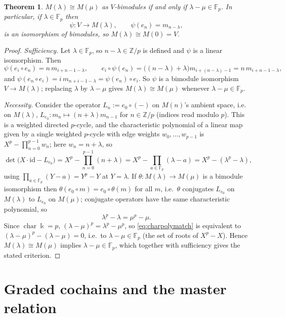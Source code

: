 \documentclass[11pt,reqno]{amsart}
\theoremstyle{plain}
\newtheorem{theorem}{Theorem}[section]
\theoremstyle{definition}
\newcommand{\kk}{\Bbbk}
\newcommand{\Fp}{\mathbb{F}_p}
\newcommand{\Zp}{\mathbb{Z}/p}
\begin{document}
\begin{theorem}\label{thm:iso}
$M(\lambda)\cong M(\mu)$ as $V$-bimodules if and only if $\lambda-\mu\in\Fp$. In particular,
if $\lambda\in\Fp$ then
\[
\psi:V\longrightarrow M(\lambda),\qquad \psi(e_n)=m_{n-\lambda},
\]
is an isomorphism of bimodules, so $M(\lambda)\cong M(0)=V$.
\end{theorem}

\begin{proof}
\emph{Sufficiency.} Let $\lambda\in\Fp$, so $n-\lambda\in\Zp$ is defined and $\psi$ is a
linear isomorphism. Then
\[
\psi(e_i\circ e_n)=n\,m_{i+n-1-\lambda},\qquad
e_i\circ\psi(e_n)=\bigl((n-\lambda)+\lambda\bigr)m_{i+(n-\lambda)-1}=n\,m_{i+n-1-\lambda},
\]
and $\psi(e_n\circ e_i)=i\,m_{n+i-1-\lambda}=\psi(e_n)\circ e_i$. So $\psi$ is a bimodule
isomorphism $V\to M(\lambda)$; replacing $\lambda$ by $\lambda-\mu$ gives
$M(\lambda)\cong M(\mu)$ whenever $\lambda-\mu\in\Fp$.

\emph{Necessity.} Consider the operator $L_n:=e_0\circ(-)$ on $M(n)$'s ambient space, i.e.
on $M(\lambda)$, $L_{e_0}:m_n\mapsto(n+\lambda)m_{n-1}$ for $n\in\Zp$ (indices read modulo
$p$). This is a weighted directed $p$-cycle, and the characteristic polynomial of a linear
map given by a single weighted $p$-cycle with edge weights $w_0,\dots,w_{p-1}$ is
$X^p-\prod_{n=0}^{p-1}w_n$; here $w_n=n+\lambda$, so
\[
\det\bigl(X\cdot\mathrm{id}-L_{e_0}\bigr)=X^p-\prod_{n=0}^{p-1}(n+\lambda)
=X^p-\prod_{a\in\Fp}(\lambda-a)=X^p-(\lambda^p-\lambda),
\]
using $\prod_{a\in\Fp}(Y-a)=Y^p-Y$ at $Y=\lambda$. If $\theta:M(\lambda)\to M(\mu)$ is a
bimodule isomorphism then $\theta(e_0\circ m)=e_0\circ\theta(m)$ for all $m$, i.e.\ $\theta$
conjugates $L_{e_0}$ on $M(\lambda)$ to $L_{e_0}$ on $M(\mu)$; conjugate operators have the
same characteristic polynomial, so
\begin{equation}
\lambda^p-\lambda=\mu^p-\mu .
\label{eq:charpolymatch}
\end{equation}
Since $\operatorname{char}\kk=p$, $(\lambda-\mu)^p=\lambda^p-\mu^p$, so
\eqref{eq:charpolymatch} is equivalent to $(\lambda-\mu)^p-(\lambda-\mu)=0$, i.e.\ to
$\lambda-\mu\in\Fp$ (the set of roots of $X^p-X$). Hence $M(\lambda)\cong M(\mu)$ implies
$\lambda-\mu\in\Fp$, which together with sufficiency gives the stated criterion.
\end{proof}

\section{Graded cochains and the master relation}\label{sec:graded}
\end{document}
